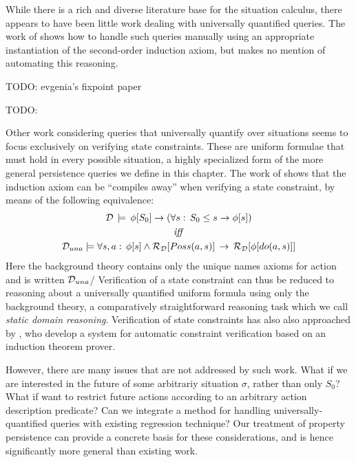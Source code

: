 While there is a rich and diverse literature base for the situation
calculus, there appears to have been little work dealing with universally
quantified queries. The work of \citet{Reiter93proving} shows how
to handle such queries manually using an appropriate instantiation
of the second-order induction axiom, but makes no mention of automating
this reasoning.

TODO: evgenia's fixpoint paper

TODO: \citep{classen08golog_properties}

Other work considering queries that universally quantify over situations
seems to focus exclusively on verifying state constraints. These are
uniform formulae that must hold in every possible situation, a highly
specialized form of the more general persistence queries we define
in this chapter. The work of \citet{Lin94-StateConstraints} shows
that the induction axiom can be {}``compiles away'' when verifying
a state constraint, by means of the following equivalence:\begin{gather*}
\mathcal{D}\,\models\,\phi[S_{0}]\rightarrow\left(\forall s:\, S_{0}\leq s\rightarrow\phi[s]\right)\\
\mathit{iff}\\
\mathcal{D}_{una}\models\forall s,a:\,\phi[s]\wedge\mathcal{R}_{\mathcal{D}}[Poss(a,s)]\,\rightarrow\,\mathcal{R}_{\mathcal{D}}[\phi[do(a,s)]]\end{gather*}
 Here the background theory contains only the unique names axioms
for action and is written $\mathcal{D}_{una}$/ Verification of a state constraint
can thus be reduced to reasoning about a universally quantified uniform
formula using only the background theory, a comparatively straightforward
reasoning task which we call \emph{static domain reasoning}. Verification
of state constraints has also also approached by \citet{bertossi96automating},
who develop a system for automatic constraint verification based on
an induction theorem prover.

However, there are many issues that are not addressed by such work.
What if we are interested in the future of some arbitrariy situation
$\sigma$, rather than only $S_{0}$? What if want to restrict future
actions according to an arbitrary action description predicate? Can
we integrate a method for handling universally-quantified queries
with existing regression technique? Our treatment of property persistence
can provide a concrete basis for these considerations, and is hence
significantly more general than existing work.


